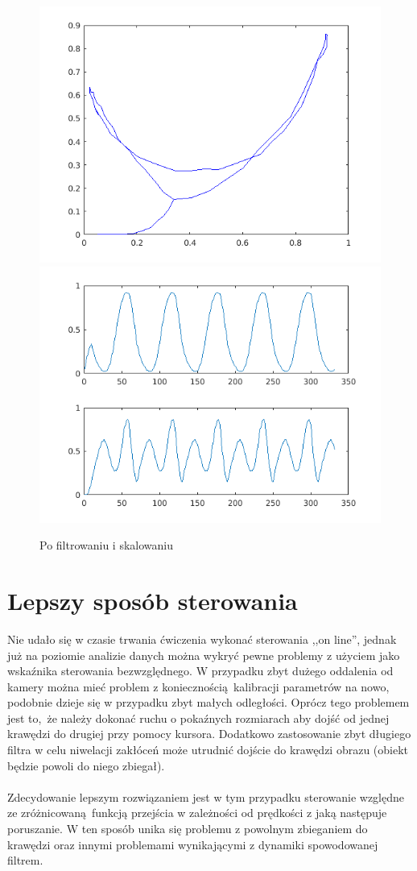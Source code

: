 \documentclass[a4paper, 12pt, titlepage]{article}
\begin{document}
        \begin{figure}[H]
            \centering
            \includegraphics[width=0.8\linewidth]{filtered_2.png}
            \includegraphics[width=0.8\linewidth]{filtered.png}
            \caption{Po filtrowaniu i skalowaniu}
        \end{figure}
    \section{Lepszy sposób sterowania}
        Nie udało się w czasie trwania ćwiczenia wykonać sterowania ,,on
        line'', jednak już na poziomie analizie danych można wykryć
        pewne problemy z użyciem jako wskaźnika sterowania bezwzględnego.
        W przypadku zbyt dużego oddalenia od kamery można mieć problem z
        koniecznością kalibracji parametrów na nowo, podobnie dzieje
        się w przypadku zbyt małych odległości. Oprócz tego problemem
        jest to, że należy dokonać ruchu o pokaźnych rozmiarach aby 
        dojść od jednej krawędzi do drugiej przy pomocy kursora. 
        Dodatkowo zastosowanie zbyt długiego filtra w celu niwelacji 
        zakłóceń może utrudnić dojście do krawędzi obrazu (obiekt będzie
        powoli do niego zbiegał).
        \\ \\
        Zdecydowanie lepszym rozwiązaniem jest w tym przypadku sterowanie
        względne ze zróżnicowaną funkcją przejścia w zależności od
        prędkości z jaką następuje poruszanie. W ten sposób unika się
        problemu z powolnym zbieganiem do krawędzi oraz innymi problemami
        wynikającymi z dynamiki spowodowanej filtrem.
\end{document}
